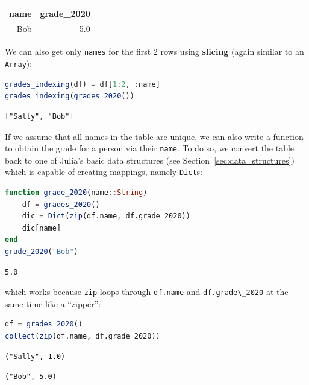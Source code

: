 \documentclass[
  notoc %
]{tufte-book}
\newcommand{\passthrough}[1]{#1}
\begin{document}
\begin{longtable}[]{@{}rr@{}}
\toprule
name & grade\_2020 \\
\midrule
\endhead
Bob & 5.0 \\
\bottomrule
\end{longtable}

We can also get only \passthrough{\lstinline!names!} for the first 2
rows using \textbf{slicing} (again similar to an
\passthrough{\lstinline!Array!}):

\begin{lstlisting}[language=Julia]
grades_indexing(df) = df[1:2, :name]
grades_indexing(grades_2020())
\end{lstlisting}

\begin{lstlisting}[language=Output]
["Sally", "Bob"]
\end{lstlisting}

If we assume that all names in the table are unique, we can also write a
function to obtain the grade for a person via their
\passthrough{\lstinline!name!}. To do so, we convert the table back to
one of Julia's basic data structures (see
Section~\ref{sec:data_structures}) which is capable of creating
mappings, namely \passthrough{\lstinline!Dict!}s:

\begin{lstlisting}[language=Julia]
function grade_2020(name::String)
    df = grades_2020()
    dic = Dict(zip(df.name, df.grade_2020))
    dic[name]
end
grade_2020("Bob")
\end{lstlisting}

\begin{lstlisting}[language=Output]
5.0
\end{lstlisting}

which works because \passthrough{\lstinline!zip!} loops through
\passthrough{\lstinline!df.name!} and
\passthrough{\lstinline!df.grade\_2020!} at the same time like a
``zipper'':

\begin{lstlisting}[language=Julia]
df = grades_2020()
collect(zip(df.name, df.grade_2020))
\end{lstlisting}

\begin{lstlisting}[language=Output]
("Sally", 1.0)
\end{lstlisting}

\begin{lstlisting}[language=Output]
("Bob", 5.0)
\end{lstlisting}
\end{document}
